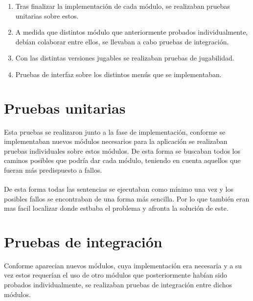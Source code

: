 \begin{enumerate}
    \item Tras finalizar la implementación de cada módulo, se realizaban pruebas unitarias sobre estos.
    \item A medida que distintos módulo que anteriormente probados individualmente, debían colaborar entre ellos, se
    llevaban a cabo pruebas de integración.
    \item Con las distintas versiones jugables se realizaban pruebas de jugabilidad.
    \item Pruebas de interfaz sobre los distintos menús que se implementaban.
\end{enumerate}

\section{Pruebas unitarias}

\paragraph{}
Esta pruebas se realizaron junto a la fase de implementación, conforme se implementaban nuevos módulos necesarios para la aplicación
se realizaban pruebas individuales sobre estos módulos. De esta forma se buscaban todos los caminos posibles que podría dar cada 
módulo, teniendo en cuenta aquellos que fueran más predispuesto a fallos.

\paragraph{}
De esta forma todas las sentencias se ejecutaban como mínimo una vez y los posibles fallos se encontraban de una forma más sencilla.
Por lo que también eran mas facil localizar donde estbaba el problema y afronta la solución de este.

\section{Pruebas de integración}

\paragraph{}
Conforme aparecian nuevos módulos, cuya implementación era necesaria y a su vez estos requerían el uso de otro módulos que 
posteriormente habían sido probados individualmente, se realizaban pruebas de integración entre dichos módulos.

